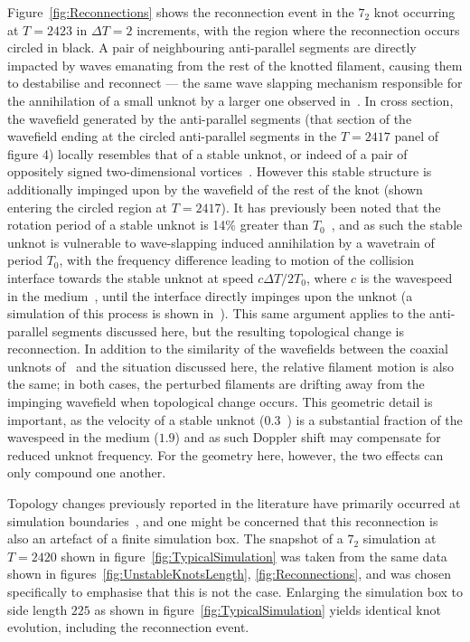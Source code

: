 Figure~\ref{fig:Reconnections} shows the reconnection event in the $7_2$ knot occurring at $T=2423$ in $\Delta T=2$ increments, with the region where the reconnection occurs circled in black. A pair of neighbouring anti-parallel segments are directly impacted by waves emanating from the rest of the knotted filament, causing them to destabilise and reconnect --- the same wave slapping mechanism responsible for the annihilation of a small unknot by a larger one observed in~\citep{Maucher2018}. In cross section, the wavefield generated by the anti-parallel segments (that section of the wavefield ending at the circled anti-parallel segments in the $T=2417$ panel of figure 4) locally resembles that of a stable unknot, or indeed of a pair of oppositely signed two-dimensional vortices~\citep{Courtemanche1990}. However this stable structure is additionally impinged upon by the wavefield of the rest of the knot (shown entering the circled region at $T=2417$). It has previously been noted that the rotation period of a stable unknot is 14\% greater than $T_0$~\citep{Maucher2018}, and as such the stable unknot is vulnerable to wave-slapping induced annihilation by a wavetrain of period $T_0$, with the frequency difference leading to motion of the collision interface towards the stable unknot at speed $c\Delta T/2T_0$, where $c$ is the wavespeed in the medium~\citep{Courtemanche1990,WinfreeChapter}, until the interface directly impinges upon the unknot (a simulation of this process is shown in~\citep{Courtemanche1990}). This same argument applies to the anti-parallel segments discussed here, but the resulting topological change is reconnection. In addition to the similarity of the wavefields between the coaxial unknots of~\citep{Maucher2018} and the situation discussed here, the relative filament motion is also the same; in both cases, the perturbed filaments are drifting away from the impinging wavefield when topological change occurs. This geometric detail is important, as the velocity of a stable unknot ($0.3$~\citep{Maucher2018}) is a substantial fraction of the wavespeed in the medium ($1.9$) and as such Doppler shift may compensate for reduced unknot frequency. For the geometry here, however, the two effects can only compound one another. 

Topology changes previously reported in the literature have primarily occurred at simulation boundaries~\citep{Maucher2017, Maucher2019}, and one might be concerned that this reconnection is also an artefact of a finite simulation box. The snapshot of a $7_2$ simulation at $T=2420$ shown in figure~\ref{fig:TypicalSimulation} was taken from the same data shown in figures~\ref{fig:UnstableKnotsLength}, \ref{fig:Reconnections}, and was chosen specifically to emphasise that this is not the case. Enlarging the simulation box to side length $225$ as shown in figure~\ref{fig:TypicalSimulation} yields identical knot evolution, including the reconnection event.

